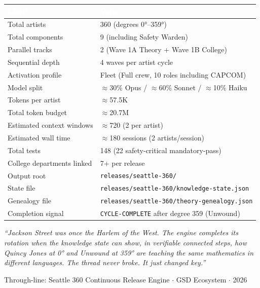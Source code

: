 \documentclass[11pt,letterpaper]{article}
\newcommand{\tblhdr}[1]{\textbf{\sffamily\textcolor{white}{#1}}}
\begin{document}
\begin{center}
\begin{tabularx}{\textwidth}{L{5.5cm}X}
\toprule
{}
\tblhdr{Metric} & \tblhdr{Value} \\
\midrule
Total artists & 360 (degrees 0°--359°) \\
Total components & 9 (including Safety Warden) \\
Parallel tracks & 2 (Wave 1A Theory + Wave 1B College) \\
Sequential depth & 4 waves per artist cycle \\
Activation profile & Fleet (Full crew, 10 roles including CAPCOM) \\
Model split & $\approx$30\% Opus / $\approx$60\% Sonnet / $\approx$10\% Haiku \\
Tokens per artist & $\approx$57.5K \\
Total token budget & $\approx$20.7M \\
Estimated context windows & $\approx$720 (2 per artist) \\
Estimated wall time & $\approx$180 sessions (2 artists/session) \\
Total tests & 148 (22 safety-critical mandatory-pass) \\
College departments linked & 7+ per release \\
Output root & \texttt{releases/seattle-360/} \\
State file & \texttt{releases/seattle-360/knowledge-state.json} \\
Genealogy file & \texttt{releases/seattle-360/theory-genealogy.json} \\
Completion signal & \texttt{CYCLE-COMPLETE} after degree 359 (Unwound) \\
\bottomrule
\end{tabularx}
\end{center}

\vspace{2em}
\begin{quotebox}
\textit{``Jackson Street was once the Harlem of the West. The engine completes its
rotation when the knowledge state can show, in verifiable connected steps, how Quincy Jones
at 0° and Unwound at 359° are teaching the same mathematics in different languages.
The thread never broke. It just changed key.''}

\medskip
\textcolor{subtlegray}{\sffamily\small Through-line: Seattle 360 Continuous Release Engine $\cdot$ GSD Ecosystem $\cdot$ 2026}
\end{quotebox}
\end{document}
